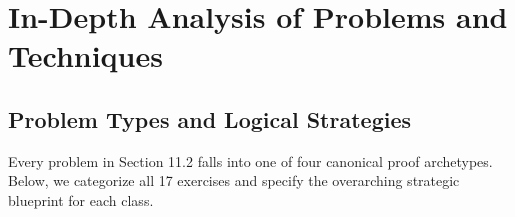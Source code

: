 \documentclass[11pt, letterpaper]{article}
\theoremstyle{definition}
\theoremstyle{remark}
\begin{document}
\section{In-Depth Analysis of Problems and Techniques}

\subsection{Problem Types and Logical Strategies}

Every problem in Section 11.2 falls into one of four canonical proof archetypes. Below, we categorize all 17 exercises and specify the overarching strategic blueprint for each class.
\end{document}

